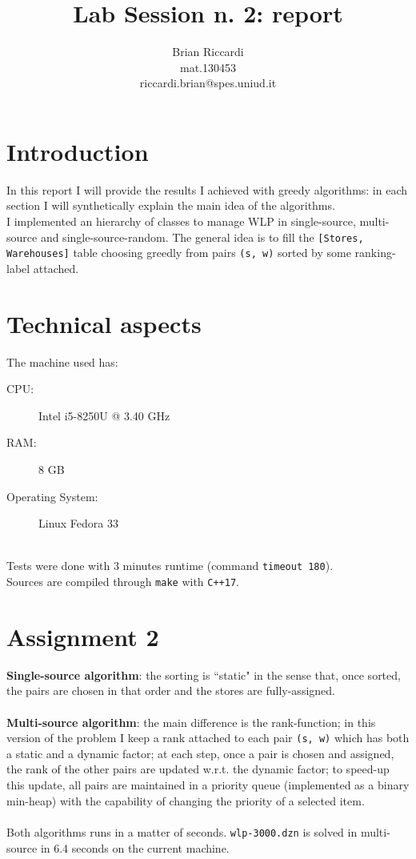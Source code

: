 \documentclass{article}
\title{Lab Session n. 2: report}
\author{Brian Riccardi \\ mat.130453 \\ riccardi.brian@spes.uniud.it}
\date{}
\begin{document}
\maketitle

\section{Introduction}
In this report I will provide the results I achieved with greedy algorithms: in each
section I will synthetically explain the main idea of the algorithms.\\
I implemented an hierarchy of classes to manage WLP in single-source, multi-source
and single-source-random. The general idea is to fill the \texttt{[Stores, Warehouses]} table
choosing greedly from pairs \texttt{(s, w)} sorted by some ranking-label attached.

\section{Technical aspects}
The machine used has:

\begin{description}
    \item[CPU:] Intel i5-8250U @ 3.40 GHz
    \item[RAM:] 8 GB
    \item[Operating System:] Linux Fedora 33
\end{description}
\ \\
Tests were done with 3 minutes runtime (command \texttt{timeout 180}).\\
Sources are compiled through \texttt{make} with \texttt{C++17}.

\section{Assignment 2}

\textbf{Single-source algorithm}: the sorting is ``static" in the sense that, once sorted, the 
pairs are chosen in that order and the stores are fully-assigned.\\
\ \\
\textbf{Multi-source algorithm}: the main difference is the rank-function; in this version of
the problem I keep a rank attached to each pair \texttt{(s, w)} which has both a static and a 
dynamic factor; at each step, once a pair is chosen and assigned, the rank of the other pairs are 
updated w.r.t. the dynamic factor; to speed-up this update, all pairs are maintained in a 
priority queue (implemented as a binary min-heap) with the capability of changing the priority of a 
selected item.\\
\ \\
Both algorithms runs in a matter of seconds. \texttt{wlp-3000.dzn} is solved in multi-source in 6.4 seconds
on the current machine.
\end{document}
